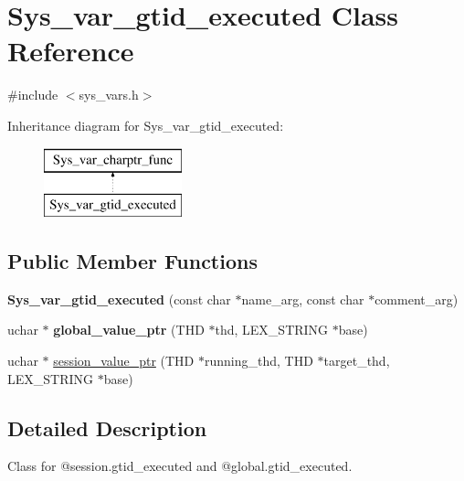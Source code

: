\hypertarget{classSys__var__gtid__executed}{}\section{Sys\+\_\+var\+\_\+gtid\+\_\+executed Class Reference}
\label{classSys__var__gtid__executed}


{\ttfamily \#include $<$sys\+\_\+vars.\+h$>$}

Inheritance diagram for Sys\+\_\+var\+\_\+gtid\+\_\+executed\+:\begin{figure}[H]
\begin{center}
\leavevmode
\includegraphics[height=2.000000cm]{classSys__var__gtid__executed}
\end{center}
\end{figure}
\subsection*{Public Member Functions}
\begin{DoxyCompactItemize}
\item 
\mbox{\label{classSys__var__gtid__executed_aa1bf3fa770684c8aa6e838d005a3c8d0}} 
{\bfseries Sys\+\_\+var\+\_\+gtid\+\_\+executed} (const char $\ast$name\+\_\+arg, const char $\ast$comment\+\_\+arg)
\item 
\mbox{\label{classSys__var__gtid__executed_a4ac96eb916d4c57c0bef115f11d9fde7}} 
uchar $\ast$ {\bfseries global\+\_\+value\+\_\+ptr} (T\+HD $\ast$thd, L\+E\+X\+\_\+\+S\+T\+R\+I\+NG $\ast$base)
\item 
uchar $\ast$ \mbox{\hyperlink{classSys__var__gtid__executed_a0dda7c15486b8024efc6feb4146b6b7e}{session\+\_\+value\+\_\+ptr}} (T\+HD $\ast$running\+\_\+thd, T\+HD $\ast$target\+\_\+thd, L\+E\+X\+\_\+\+S\+T\+R\+I\+NG $\ast$base)
\end{DoxyCompactItemize}


\subsection{Detailed Description}
Class for @session.\+gtid\+\_\+executed and @global.\+gtid\+\_\+executed. 

